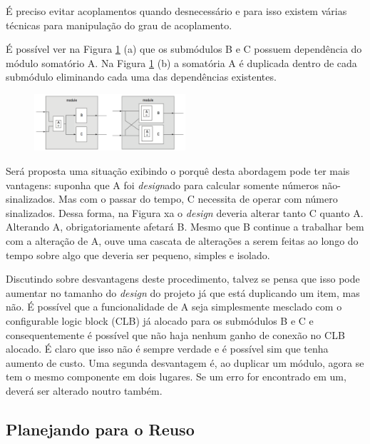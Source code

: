 É preciso evitar acoplamentos quando desnecessário e para isso existem várias técnicas para manipulação do grau de acoplamento.

É possível ver na Figura \ref{fig:f3-4} (a) que os submódulos B e C possuem dependência do módulo somatório A. Na Figura \ref{fig:f3-4} (b) a somatória A é duplicada dentro de cada submódulo eliminando cada uma das dependências existentes.



\begin{figure}[H] \centering

	\includegraphics[width=0.5\textwidth]{img/f3-4.png}

	\caption{}

	\label{fig:f3-4}

\end{figure}



Será proposta uma situação exibindo o porquê desta abordagem pode ter mais vantagens: suponha que A foi \textit{design}ado para calcular somente números não-sinalizados. Mas com o passar do tempo, C necessita de operar com número sinalizados. Dessa forma, na Figura xa o \textit{design} deveria alterar tanto C quanto A. Alterando A, obrigatoriamente afetará B. Mesmo que B continue a trabalhar bem com a alteração de A, ouve uma cascata de alterações a serem feitas ao longo do tempo sobre algo que deveria ser pequeno, simples e isolado.

Discutindo sobre desvantagens deste procedimento, talvez se pensa que isso pode aumentar no tamanho do \textit{design} do projeto já que está duplicando um item, mas não. É possível que a funcionalidade de A seja simplesmente mesclado com o configurable logic block (CLB) já alocado para os submódulos B e C e consequentemente é possível que não haja nenhum ganho de conexão no CLB alocado. É claro que isso não é sempre verdade e é possível sim que tenha aumento de custo. Uma segunda desvantagem é, ao duplicar um módulo, agora se tem o mesmo componente em dois lugares. Se um erro for encontrado em um, deverá ser alterado noutro também.





\subsection{Planejando para o Reuso}



